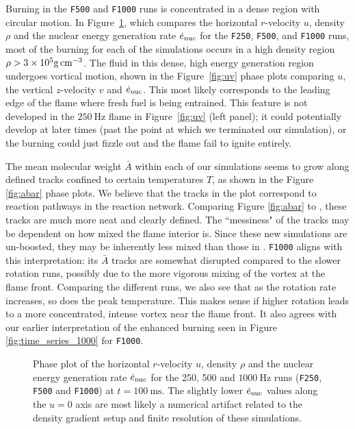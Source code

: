\documentclass[preprint,times,tighten]{aastex63}
\begin{document}
Burning in the {\tt F500} and {\tt F1000} runs is concentrated in a dense region with circular 
motion. In Figure~\ref{fig:urho}, which compares the horizontal $r$-velocity $u$, density $\rho$ and the 
nuclear energy generation rate $\dot{e}_{\rm nuc}$ for the {\tt F250}, {\tt F500}, and {\tt F1000} 
runs, most of the burning for each of the simulations occurs in a high density region $\rho > 3 
\times 10^5 {\rm g\,cm^{-3}}$. The fluid in this dense, high energy generation region undergoes 
vortical motion, shown in the Figure~\ref{fig:uv} phase plots comparing $u$, the vertical $z$-velocity $v$ and $\dot{e}_{\rm 
nuc}$. This most likely corresponds to the leading edge of the flame where fresh fuel is being entrained.
This feature is not developed in the $250~\mathrm{Hz}$ flame in Figure~\ref{fig:uv} (left panel); it could potentially develop 
at later times (past the point at which we terminated our simulation), or the burning could just 
fizzle out and the flame fail to ignite entirely. 

The mean molecular weight $\bar{A}$ within each of our simulations seems to grow along defined tracks confined to certain temperatures $T$, as shown in the Figure \ref{fig:abar} phase plots. We believe that the tracks in the plot correspond to reaction pathways in the reaction network. Comparing Figure \ref{fig:abar} to \citet{flame_wave1}, these tracks are much more neat and clearly defined. The ``messiness" of the tracks may be dependent on how mixed the flame interior is. Since these new simulations are un-boosted, they may be inherently less mixed than those in \citet{flame_wave1}. {\tt F1000} aligns with this interpretation: its $\bar{A}$ tracks are somewhat disrupted compared to the slower rotation runs, possibly due to the more vigorous mixing of the vortex at the flame front. Comparing the different runs, we also see that as the rotation rate increases, so does the peak temperature. This makes sense if higher rotation leads to a more concentrated, intense vortex near the flame front. It also agrees with our earlier interpretation of the enhanced burning seen in Figure \ref{fig:time_series_1000} for {\tt F1000}. 

\begin{figure}[t]
    \centering
    \caption{\label{fig:urho}Phase plot of the horizontal $r$-velocity $u$, density $\rho$ and the nuclear energy generation rate $\dot{e}_{\rm nuc}$ for the 250, 500 and $1000~\mathrm{Hz}$ runs ({\tt F250}, {\tt F500} and {\tt F1000}) at $t = 100~\mathrm{ms}$. The slightly lower $\dot{e}_{\rm nuc}$ values along the $u = 0$ axis are most likely a numerical artifact related to the density gradient setup and finite resolution of these simulations.}
\end{figure}
\end{document}
